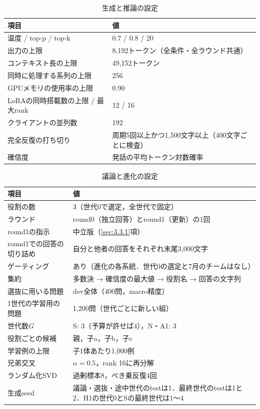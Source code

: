 \begin{table}[htbp]
\caption{生成と推論の設定}
\label{tab:4.3}
\centering
\small
\begin{tabular}{|l|p{7.4cm}|}
\hline
項目 & 値 \\
\hline
温度 / top-p / top-k & 0.7 / 0.8 / 20 \\
出力の上限 & 8,192トークン（全条件・全ラウンド共通） \\
コンテキスト長の上限 & 49,152トークン \\
同時に処理する系列の上限 & 256 \\
GPUメモリの使用率の上限 & 0.90 \\
LoRAの同時搭載数の上限 / 最大rank & 12 / 16 \\
クライアントの並列数 & 192 \\
完全反復の打ち切り & 周期5回以上かつ1,500文字以上（400文字ごとに検査） \\
確信度 & 発話の平均トークン対数確率 \\
\hline
\end{tabular}
\end{table}

\begin{table}[htbp]
\caption{議論と進化の設定}
\label{tab:4.4}
\centering
\small
\begin{tabular}{|l|p{8.6cm}|}
\hline
項目 & 値 \\
\hline
役割の数 & 3（世代0で選定，全世代で固定） \\
ラウンド & round0（独立回答）とround1（更新）の1回 \\
round1の指示 & 中立版（\ref{sec:3.3.1}項） \\
round1での回答の切り詰め & 自分と他者の回答をそれぞれ末尾3,000文字 \\
ゲーティング & あり（進化の各系統．世代0の選定と7月のチームはなし） \\
集約 & 多数決 → 確信度の最大値 → 役割名 → 回答の文字列 \\
選抜に用いる問題 & dev全体（400問，macro精度） \\
1世代の学習用の問題 & 1,200問（世代ごとに新しい組） \\
世代数$G$ & S: 3（予算が許せば4），N・A1: 3 \\
役割ごとの候補 & 親，子a，子b，子c \\
学習例の上限 & 子1体あたり1,000例 \\
兄弟交叉 & $\alpha = 0.5$，rank 16に再分解 \\
ランダム化SVD & 過剰標本8，べき乗反復4回 \\
生成seed & 議論・選抜・途中世代のtestは1．最終世代のtestは1と2．H1の世代0とSの最終世代は1〜4 \\
\hline
\end{tabular}
\end{table}

